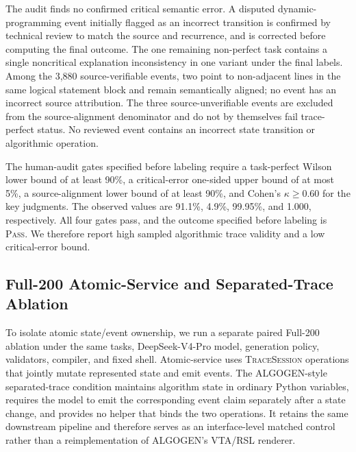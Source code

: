 \documentclass[letterpaper]{article}
\begin{document}
The audit finds no confirmed critical semantic error. A disputed
dynamic-programming event initially flagged as an incorrect transition
is confirmed by technical review to match the source and recurrence,
and is corrected before computing the final outcome. The one remaining
non-perfect task contains a single noncritical explanation inconsistency
in one variant under the final labels. Among the 3,880 source-verifiable
events, two point to non-adjacent lines in the same logical statement
block and remain semantically aligned; no event has an incorrect source
attribution. The three source-unverifiable events are excluded from the
source-alignment denominator and do not by themselves fail trace-perfect
status. No reviewed event contains an incorrect state transition or
algorithmic operation.

The human-audit gates specified before labeling require a task-perfect Wilson lower
bound of at least 90\%, a critical-error one-sided upper bound of at
most 5\%, a source-alignment lower bound of at least 90\%, and Cohen's
$\kappa\geq0.60$ for the key judgments. The observed values are 91.1\%,
4.9\%, 99.95\%, and 1.000, respectively. All four gates pass, and the
outcome specified before labeling is \textsc{Pass}. We therefore report high
sampled algorithmic trace validity and a low critical-error bound.

\FloatBarrier

\subsection{Full-200 Atomic-Service and Separated-Trace Ablation}
\label{sec:atomic-service-ablation}

To isolate atomic state/event ownership, we run a separate paired
Full-200 ablation under the same tasks, DeepSeek-V4-Pro model,
generation policy, validators, compiler, and fixed shell. Atomic-service
uses \textsc{TraceSession} operations that jointly mutate represented
state and emit events. The ALGOGEN-style separated-trace condition
maintains algorithm state in ordinary Python variables, requires the
model to emit the corresponding event claim separately after a state
change, and provides no helper that binds the two operations. It retains
the same downstream pipeline and therefore serves as an interface-level
matched control rather than a reimplementation of ALGOGEN's VTA/RSL
renderer.
\end{document}
